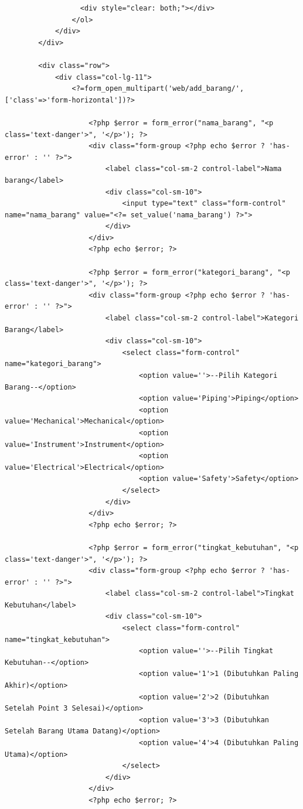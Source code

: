 \begin{enumerate}
\begin{enumerate}
\begin{lstlisting}
                  <div style="clear: both;"></div>
                </ol>
            </div>
        </div>

        <div class="row">
            <div class="col-lg-11">
                <?=form_open_multipart('web/add_barang/',['class'=>'form-horizontal'])?>

                    <?php $error = form_error("nama_barang", "<p class='text-danger'>", '</p>'); ?>
                    <div class="form-group <?php echo $error ? 'has-error' : '' ?>">
                        <label class="col-sm-2 control-label">Nama barang</label>
                        <div class="col-sm-10">
                            <input type="text" class="form-control" name="nama_barang" value="<?= set_value('nama_barang') ?>">
                        </div>
                    </div>
                    <?php echo $error; ?>

                    <?php $error = form_error("kategori_barang", "<p class='text-danger'>", '</p>'); ?>
                    <div class="form-group <?php echo $error ? 'has-error' : '' ?>">
                        <label class="col-sm-2 control-label">Kategori Barang</label>
                        <div class="col-sm-10">
                            <select class="form-control" name="kategori_barang">
                                <option value=''>--Pilih Kategori Barang--</option>
                                <option value='Piping'>Piping</option>
                                <option value='Mechanical'>Mechanical</option>
                                <option value='Instrument'>Instrument</option>
                                <option value='Electrical'>Electrical</option>
                                <option value='Safety'>Safety</option>
                            </select>
                        </div>
                    </div>
                    <?php echo $error; ?>

                    <?php $error = form_error("tingkat_kebutuhan", "<p class='text-danger'>", '</p>'); ?>
                    <div class="form-group <?php echo $error ? 'has-error' : '' ?>">
                        <label class="col-sm-2 control-label">Tingkat Kebutuhan</label>
                        <div class="col-sm-10">
                            <select class="form-control" name="tingkat_kebutuhan">
                                <option value=''>--Pilih Tingkat Kebutuhan--</option>
                                <option value='1'>1 (Dibutuhkan Paling Akhir)</option>
                                <option value='2'>2 (Dibutuhkan Setelah Point 3 Selesai)</option>
                                <option value='3'>3 (Dibutuhkan Setelah Barang Utama Datang)</option>
                                <option value='4'>4 (Dibutuhkan Paling Utama)</option>
                            </select>
                        </div>
                    </div>
                    <?php echo $error; ?>


\end{lstlisting}
\end{enumerate}
\end{enumerate}
